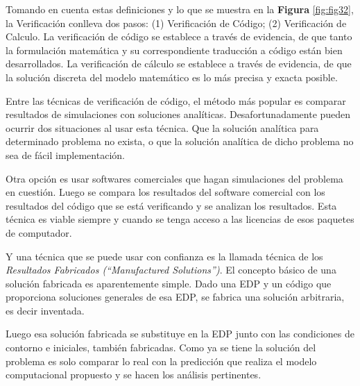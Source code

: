 Tomando en cuenta estas definiciones y lo que se muestra en la \textbf{Figura} \ref{fig:fig32}, la Verificación conlleva dos pasos: (1) Verificación de Código; (2) Verificación de Calculo. La verificación de código se establece a través de evidencia, de que tanto la formulación matemática y su correspondiente traducción a código están bien desarrollados. La verificación de cálculo se establece a través de evidencia, de que la solución discreta del modelo matemático es lo más precisa y exacta posible.\bigskip


Entre las técnicas de verificación de código, el método más popular es comparar resultados de simulaciones con soluciones analíticas. Desafortunadamente pueden ocurrir dos situaciones al usar esta técnica. Que la solución analítica para determinado problema no exista, o que la solución analítica de dicho problema no sea de fácil implementación.\bigskip

Otra opción es usar softwares comerciales que hagan simulaciones del problema en cuestión. Luego se compara los resultados del software comercial con los resultados del código que se está verificando y se analizan los resultados. Esta técnica es viable siempre y cuando se tenga acceso a las licencias de esos paquetes de computador.\bigskip

Y una técnica que se puede usar con confianza es la llamada técnica de los \textit{Resultados Fabricados (“Manufactured Solutions”)}. El concepto básico de una solución fabricada es aparentemente simple. Dado una EDP y un código que proporciona soluciones generales de esa EDP, se fabrica una solución arbitraria, es decir inventada. \bigskip

Luego esa solución fabricada se substituye en la EDP junto con las condiciones de contorno e iniciales, también fabricadas. Como ya se tiene la solución del problema es solo comparar lo real con la predicción que realiza el modelo computacional propuesto y se hacen los análisis pertinentes.\newpage


